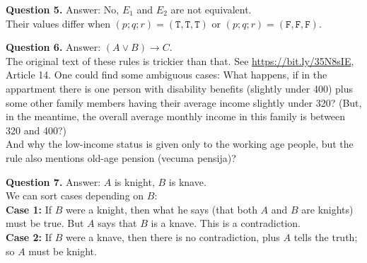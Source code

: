 \documentclass[jou]{apa6}
\begin{document}
\vspace{10pt}
\noindent
{\bf Question 5.} Answer: No, $E_1$ and $E_2$ are not equivalent.\\
Their values differ when $(p;q;r)=(\mathtt{T},\mathtt{T},\mathtt{T})$ or 
$(p;q;r)=(\mathtt{F},\mathtt{F},\mathtt{F})$.

\vspace{10pt}
\noindent
{\bf Question 6.} Answer: $(A \vee B) \rightarrow C$.\\ 
The original text of these rules is trickier than that. 
See \url{https://bit.ly/35N8sIE}, Article 14. 
One could find some ambiguous cases: What happens, if in the appartment there is 
one person with disability benefits (slightly under 400) plus some other family members
having their average income slightly under 320? (But, in the meantime, 
the overall average monthly income in this family is between 320 and 400?) \\
And why the low-income status is
given only to the working age people, but the rule also mentions old-age pension
(vecuma pensija)? 

\vspace{10pt}
\noindent
{\bf Question 7.} Answer: $A$ is knight, $B$ is knave.\\
We can sort cases depending on $B$:\\
{\bf Case 1:} If $B$ were a knight, then what he says (that both $A$ and $B$ are knights)
must be true. But $A$ says that $B$ is a knave. This is a contradiction.\\
{\bf Case 2:} If $B$ were a knave, then there is no contradiction, plus $A$ tells the truth; 
so $A$ must be knight.
\end{document}
